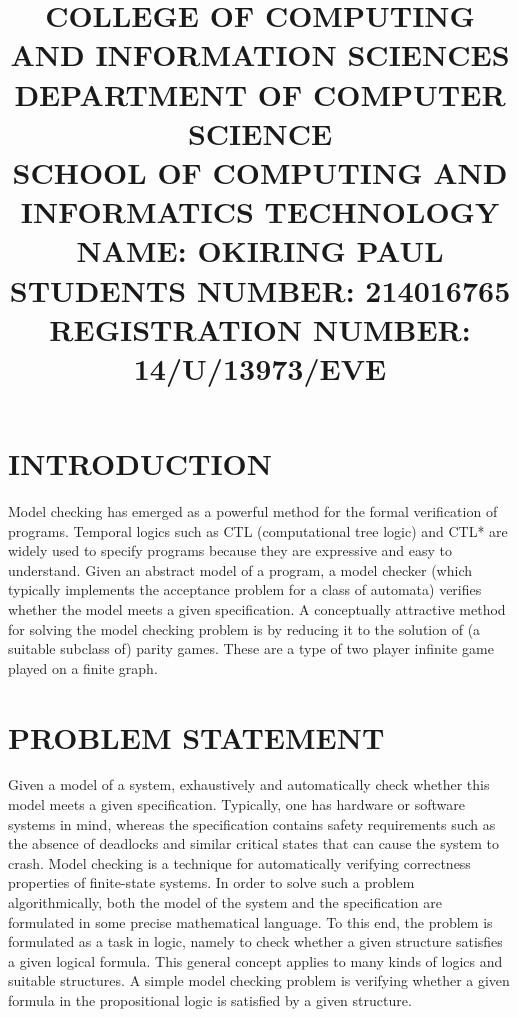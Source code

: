 \documentclass[12pt,letterpaper]{article}
\begin{document}
\title{COLLEGE OF COMPUTING AND INFORMATION SCIENCES\\ DEPARTMENT OF COMPUTER SCIENCE\\ SCHOOL OF COMPUTING AND INFORMATICS TECHNOLOGY\\}
\maketitle
\title{NAME:	     OKIRING PAUL\\
STUDENTS NUMBER:	 214016765\\
REGISTRATION NUMBER: 14/U/13973/EVE}
\maketitle

\section{INTRODUCTION}

     Model checking has emerged as a powerful method for the formal verification of programs. Temporal logics such as CTL (computational tree logic) and CTL* are widely used to specify programs because they are expressive and easy to understand. Given an abstract model of a program, a model checker (which typically implements the acceptance problem for a class of automata) verifies whether the model meets a given specification. A conceptually attractive method for solving the model checking problem is by reducing it to the solution of (a suitable subclass of) parity games. These are a type of two player infinite game played on a finite graph.
\section{PROBLEM STATEMENT}
Given a model of a system, exhaustively and automatically check whether this model meets a given specification. Typically, one has hardware or software systems in mind, whereas the specification contains safety requirements such as the absence of deadlocks and similar critical states that can cause the system to crash. Model checking is a technique for automatically verifying correctness properties of finite-state systems.
In order to solve such a problem algorithmically, both the model of the system and the specification are formulated in some precise mathematical language. To this end, the problem is formulated as a task in logic, namely to check whether a given structure satisfies a given logical formula. This general concept applies to many kinds of logics and suitable structures. A simple model checking problem is verifying whether a given formula in the propositional logic is satisfied by a given structure.
\end{document}
